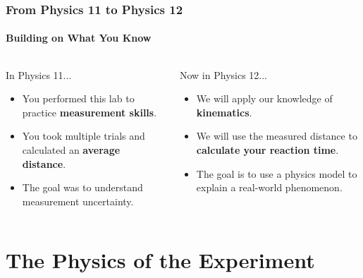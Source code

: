 \documentclass{beamer}
\begin{document}
\begin{frame}
\frametitle{From Physics 11 to Physics 12}
\framesubtitle{Building on What You Know}
    \begin{columns}[T]
        \begin{alertblock}{In Physics 11...}
            \begin{itemize}
                \item You performed this lab to practice \textbf{measurement skills}.
                \item You took multiple trials and calculated an \textbf{average distance}.
                \item The goal was to understand measurement uncertainty.
            \end{itemize}
        \end{alertblock}

        \begin{block}{Now in Physics 12...}
            \begin{itemize}
                \item We will apply our knowledge of \textbf{kinematics}.
                \item We will use the measured distance to \textbf{calculate your reaction time}.
                \item The goal is to use a physics model to explain a real-world phenomenon.
            \end{itemize}
        \end{block}
    \end{columns}
\end{frame}

\section{The Physics of the Experiment}
\end{document}
